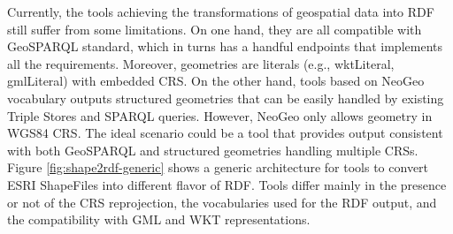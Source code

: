 Currently, the tools achieving the transformations of geospatial data into RDF still suffer from some limitations. On one hand, they are all compatible with GeoSPARQL standard, which in turns has a handful endpoints that implements all the requirements. Moreover, geometries are literals (e.g., wktLiteral, gmlLiteral) with embedded CRS. On the other hand, tools based on NeoGeo vocabulary outputs structured geometries that can be easily handled by existing Triple Stores and SPARQL queries. However, NeoGeo only allows geometry in WGS84 CRS. The ideal scenario could be a tool that provides output consistent with both GeoSPARQL and structured geometries handling multiple CRSs.
Figure \ref{fig:shape2rdf-generic} shows a generic architecture for tools to convert ESRI ShapeFiles into different flavor of RDF. Tools differ mainly in the presence or not of the CRS reprojection, the vocabularies used for the RDF output, and the compatibility with GML and WKT representations.

\begin{figure}[ht!b]
\end{figure}


